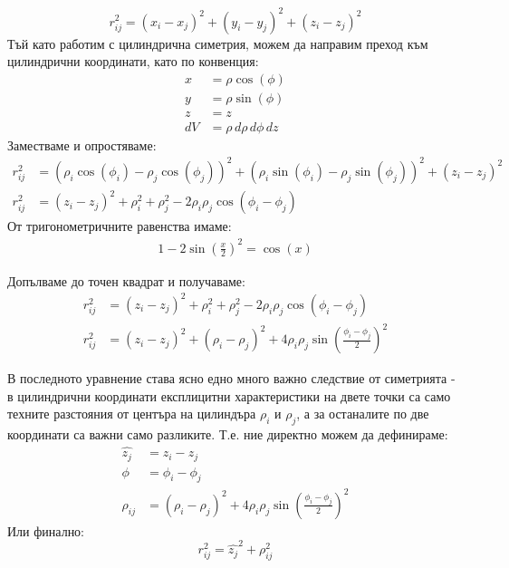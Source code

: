 \begin{equation}
	r_{ij}^2 = (x_{i} - x_{j})^2  + (y_{i} - y_{j})^2 + (z_{i}-z_{j})^2
	\label{eq:cartesian}
\end{equation}
Тъй като работим с цилиндрична симетрия, можем да направим преход към цилиндрични координати, като по конвенция:
\begin{align*}
	x  & = \rho \cos(\phi)           \\
	y  & = \rho \sin(\phi)           \\
	z  & = z                         \\
	dV & = \rho \,d\rho \,d\phi \,dz 
\end{align*}
Заместваме и опростяваме:
\begin{align*}
	r_{ij}^2 & = (\rho_{i}\cos(\phi_{i}) - \rho_{j}\cos(\phi_{j}))^2 + (\rho_{i}\sin(\phi_{i}) - \rho_{j}\sin(\phi_{j}))^2 + (z_i - z_j)^2 \\
	r_{ij}^2 & = (z_i - z_j)^2 + \rho_{i}^2 + \rho_{j}^2 - 2\rho_{i}\rho_{j}\cos{(\phi_i - \phi_j)}                                        
\end{align*}
От тригонометричните равенства имаме:
\begin{align*}
	1-2 \sin{\left(\frac{x}{2}\right)}^2=\cos (x) 
\end{align*}

Допълваме до точен квадрат и получаваме:
\begin{align*}
	r_{ij}^2 & = (z_i - z_j)^2 + \rho_{i}^2 + \rho_{j}^2 - 2\rho_{i}\rho_{j}\cos{(\phi_i - \phi_j)}                    \\
	r_{ij}^2 & = (z_i - z_j)^2  + (\rho_i - \rho_j)^2 + 4 \rho_i \rho_j \sin{\left( \frac{\phi_i-\phi_j}{2} \right)}^2 
\end{align*}

В последното уравнение става ясно едно много важно следствие от симетрията - в цилиндрични координати експлицитни характеристики на двете точки са само техните разстояния от центъра на 
цилиндъра $\rho_{i}$ и $\rho_j$, а за останалите по две координати са важни само разликите. Т.е. ние директно можем да дефинираме:
\begin{align*}
	\hat{z_j} & = z_i - z_j                                                                            \\
	\phi      & = \phi_i - \phi_j                                                                      \\
	\rho_{ij} & = (\rho_i - \rho_j)^2 + 4 \rho_i \rho_j \sin{\left( \frac{\phi_i-\phi_j}{2} \right)}^2 
\end{align*}
Или финално:
\begin{equation}
	\label{eq:cylindricalcoords}
	r_{ij}^2 =  \hat{z_{j}}^2 + \rho_{ij}^2
\end{equation}

